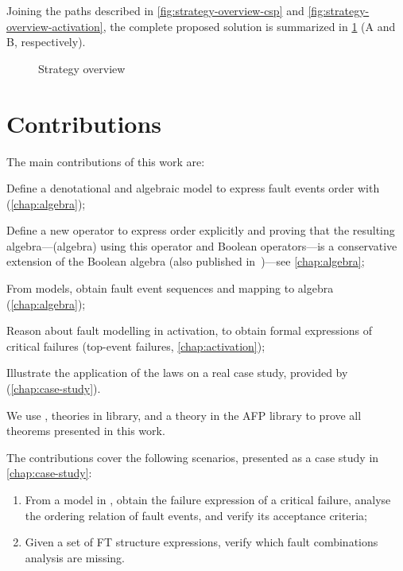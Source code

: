 Joining the paths described in \cref{fig:strategy-overview-csp} and \cref{fig:strategy-overview-activation}, the complete proposed solution is summarized in \cref{fig:strategy-overview} (A and B, respectively).
%
\begin{figure}[htb]
  \centering
  \caption{Strategy overview}
  \label{fig:strategy-overview}
\end{figure}

\section{Contributions}

The main contributions of this work are:

\begin{contrenum}[series=contributions]
  \item Define a denotational and algebraic model to express fault events order with  (\cref{chap:algebra});
  \item Define a new operator to express order explicitly and proving that the resulting algebra---(\ac{algebra}) using this operator and Boolean operators---is a conservative extension of the Boolean algebra (also published in~\cite{DM2016})---see \cref{chap:algebra};
  \item From \simulink models, obtain fault event sequences and mapping to \ac{algebra} (\cref{chap:algebra});
  \item Reason about fault modelling in \ac{activation}, to obtain formal expressions of critical failures (top-event failures, \cref{chap:activation});
  \item Illustrate the application of the laws on a real case study, provided by \embraer (\cref{chap:case-study}).
\end{contrenum}

We use \isabellehol, theories in  library, and a theory in the AFP library \cite{JM2005} to prove all theorems presented in this work.

The contributions cover the following scenarios, presented as a case study in \cref{chap:case-study}:
\begin{enumerate}
  \item From a model in \simulink, obtain the failure expression of a critical failure, analyse the ordering relation of fault events, and verify its acceptance criteria;
  \item Given a set of \ac{FT} structure expressions, verify which fault combinations analysis are missing.
\end{enumerate}

